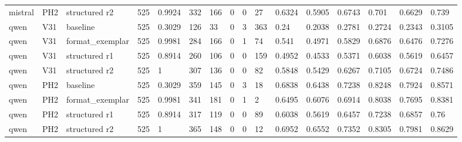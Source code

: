 \begin{tabular}{llllllllllllllll}
mistral & PH2 & structured r2 & 525 & 0.9924 & 332 & 166 & 0 & 0 & 27 & 0.6324 & 0.5905 & 0.6743 & 0.701 & 0.6629 & 0.739 \\
qwen & V31 & baseline & 525 & 0.3029 & 126 & 33 & 0 & 3 & 363 & 0.24 & 0.2038 & 0.2781 & 0.2724 & 0.2343 & 0.3105 \\
qwen & V31 & format\_exemplar & 525 & 0.9981 & 284 & 166 & 0 & 1 & 74 & 0.541 & 0.4971 & 0.5829 & 0.6876 & 0.6476 & 0.7276 \\
qwen & V31 & structured r1 & 525 & 0.8914 & 260 & 106 & 0 & 0 & 159 & 0.4952 & 0.4533 & 0.5371 & 0.6038 & 0.5619 & 0.6457 \\
qwen & V31 & structured r2 & 525 & 1 & 307 & 136 & 0 & 0 & 82 & 0.5848 & 0.5429 & 0.6267 & 0.7105 & 0.6724 & 0.7486 \\
qwen & PH2 & baseline & 525 & 0.3029 & 359 & 145 & 0 & 3 & 18 & 0.6838 & 0.6438 & 0.7238 & 0.8248 & 0.7924 & 0.8571 \\
qwen & PH2 & format\_exemplar & 525 & 0.9981 & 341 & 181 & 0 & 1 & 2 & 0.6495 & 0.6076 & 0.6914 & 0.8038 & 0.7695 & 0.8381 \\
qwen & PH2 & structured r1 & 525 & 0.8914 & 317 & 119 & 0 & 0 & 89 & 0.6038 & 0.5619 & 0.6457 & 0.7238 & 0.6857 & 0.76 \\
qwen & PH2 & structured r2 & 525 & 1 & 365 & 148 & 0 & 0 & 12 & 0.6952 & 0.6552 & 0.7352 & 0.8305 & 0.7981 & 0.8629 \\
\bottomrule
\end{tabular}
